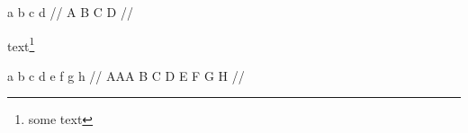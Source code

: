 \documentclass[12pt]{article}
\begin{document}
\ex
{}
\begingl
\gla a b c d //
\glb A B C D //
\endgl
{}
\xe

text\footnote{some text}

\ex
{}
\begingl
\gla a b c d e f g h //
\glb AAA B C D E F G H //
\endgl
{}
\xe
\end{document}
